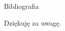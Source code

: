 \documentclass[11pt,pdftex,mathserif]{beamer}\usepackage[]{graphicx}\usepackage[]{color}
\theoremstyle{definition}
\begin{document}
\begin{frame}{Bibliografia}
\nocite{Wolfowitz1951:wald}
\nocite{Hist:wald}
\nocite{Enc:wald}


\end{frame}


% 
% 
% 
% 

\begin{frame}{}
   \begin{center}
      \Huge{Dziękuję za uwagę.}
   \end{center}
\end{frame}
\end{document}
